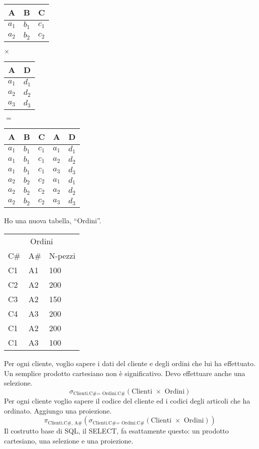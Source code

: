 \begin{center}
\begin{tabular}{ccc}
A & B & C \\
\hline
$a_1$ & $b_1$ & $c_1$ \\
$a_2$ & $b_2$ & $c_2$
\end{tabular}
$\times$
\begin{tabular}{cc}
A & D \\
\hline
$a_1$ & $d_1$ \\
$a_2$ & $d_2$ \\
$a_3$ & $d_3$ 
\end{tabular}
$=$
\begin{tabular}{ccccc}
A & B & C & A & D \\
\hline
$a_1$ & $b_1$ & $c_1$ & $a_1$ & $d_1$ \\
$a_1$ & $b_1$ & $c_1$ & $a_2$ & $d_2$ \\
$a_1$ & $b_1$ & $c_1$ & $a_3$ & $d_3$ \\
$a_2$ & $b_2$ & $c_2$ & $a_1$ & $d_1$ \\
$a_2$ & $b_2$ & $c_2$ & $a_2$ & $d_2$ \\
$a_2$ & $b_2$ & $c_2$ & $a_3$ & $d_3$ 
\end{tabular}
\end{center}

Ho una nuova tabella, ``Ordini''.

\begin{center}
\begin{tabular}{lll}
\multicolumn{3}{c}{Ordini} \\
C\# & A\# & N-pezzi \\
\hline
C1 & A1 & 100 \\
C2 & A2 & 200 \\
C3 & A2 & 150 \\
C4 & A3 & 200 \\
C1 & A2 & 200 \\
C1 & A3 & 100 \\
\end{tabular}
\end{center}

Per ogni cliente, voglio sapere i dati del cliente e degli ordini che lui ha effettuato. Un semplice prodotto cartesiano non \`e significativo. Devo effettuare anche una selezione.
\[
\sigma_{\text{Clienti.C\# = Ordini.C\#}} \left( \text{Clienti } \times \text{ Ordini} \right)
\]
Per ogni cliente voglio sapere il codice del cliente ed i codici degli articoli che ha ordinato. Aggiungo una proiezione.
\[
\pi_{\text{Clienti.C\#, A\#}}
\left(
\sigma_{\text{Clienti.C\# = Ordini.C\#}} \left( \text{Clienti } \times \text{ Ordini} \right)
\right)
\]
Il costrutto base di SQL, il SELECT, fa esattamente questo: un prodotto cartesiano, una selezione e una proiezione.

